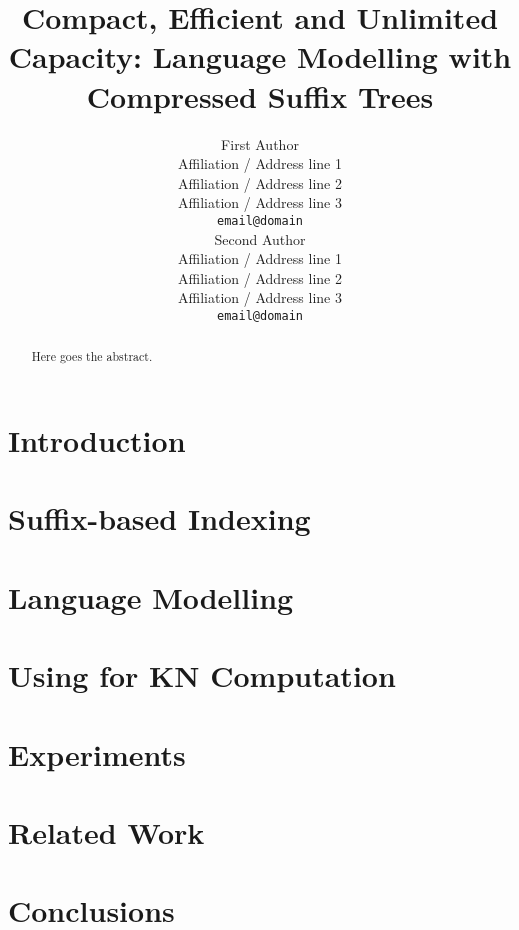 \documentclass[11pt,a4paper]{article}
\title{Compact, Efficient and Unlimited Capacity:
    Language Modelling with Compressed Suffix Trees}
\author{First Author \\
  Affiliation / Address line 1 \\
  Affiliation / Address line 2 \\
  Affiliation / Address line 3 \\
  {\tt email@domain} \\\And
  Second Author \\
  Affiliation / Address line 1 \\
  Affiliation / Address line 2 \\
  Affiliation / Address line 3 \\
  {\tt email@domain} \\}
\date{}
\begin{document}
\maketitle
\begin{abstract}
  Here goes the abstract.
\end{abstract}

\section{Introduction}
\label{sec-intro}



\section{Suffix-based Indexing}
\label{sec-suffix}


\section{Language Modelling}
\label{sec-lm}


\section{Using \CSTs for KN Computation}
\label{sec-lmsdsl}


\section{Experiments}
\label{sec-experiments}
%








\section{Related Work}

\cite{brants2007large}
\cite{guthrie2010storing}
\cite{brants2006web}
\cite{stolcke2011srilm}
\cite{stolcke2002srilm}
\cite{pauls2011faster}
\cite{heafield2011kenlm}
\cite{kennington2012suffix}
\cite{wood2011sequence}
\cite{chen1996empirical}
\cite{kneser1995improved}
\cite{chen1996empirical}
\cite{navarro2007compressed}
\cite{gog2014theory}

\section{Conclusions}



\end{document}
